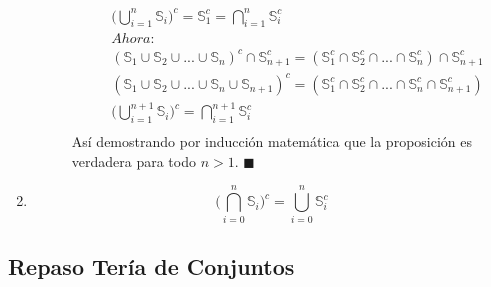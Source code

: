 \documentclass[a4paper,dvipsnames]{book}
\begin{document}
\begin{enumerate}
\begin{description}
\begin{equation*}
                            \begin{split}
                            &\Big(\bigcup_{i=1}^{n}\mathbb S_{i}\Big)^{c} =
                                \mathbb S_{1}^{c}=\bigcap_{i=1}^{n}\mathbb
                                S_{i}^{c}\\
                            &Ahora:\\
                            &\left(\mathbb S_{1}\cup\mathbb
                                S_{2}\cup...\cup\mathbb
                                S_{n}\right)^{c}\cap\mathbb S_{n+1}^{c}
                                =\left(\mathbb S_{1}^{c}\cap\mathbb
                                S_{2}^{c}\cap...\cap\mathbb
                                S_{n}^{c}\right)\cap\mathbb S_{n+1}^{c}\\
                            &\left(\mathbb S_{1}\cup\mathbb
                                S_{2}\cup...\cup\mathbb S_{n}\cup\mathbb
                                S_{n+1}\right)^{c}=\left(\mathbb
                                S_{1}^{c}\cap\mathbb
                                S_{2}^{c}\cap...\cap\mathbb
                                S_{n}^{c}\cap\mathbb S_{n+1}^{c}\right)\\
                            &\Big(\bigcup_{i=1}^{n+1}\mathbb
                                S_{i}\Big)^{c}=\bigcap_{i=1}^{n+1}\mathbb
                                S_{i}^{c}\\
                            \end{split}
                            \end{equation*}
                            Así demostrando por inducción matemática que la
                            proposición es verdadera para todo $n>1$.
                            $\blacksquare$

                    \end{description}

                \item \[\Big(\bigcap_{i=0}^{n}\mathbb S_i\Big)^{c} =
                    \bigcup_{i=0}^{n}\mathbb S_{i}^{c}\]
            \end{enumerate}



    \subsection{Repaso Tería de Conjuntos}
\end{document}
